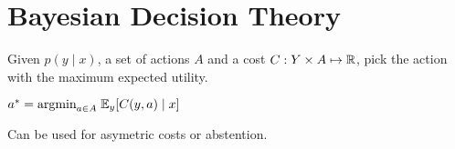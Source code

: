 \section*{Bayesian Decision Theory}

Given $p(y \; | \; x)$, a set of actions $A$ and a cost $C: Y \times A \mapsto \mathbb{R}$, pick the action with the maximum expected utility. 

\qquad \qquad $a^* = \text{argmin}_{a \in A} \; \mathbb{E}_y[C(y,a) \; | \; x]$

Can be used for asymetric costs or abstention.